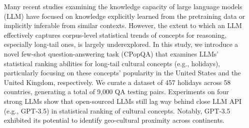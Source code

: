 Many recent studies examining the knowledge capacity of large language models (LLM) have focused on knowledge explicitly learned from the pretraining data or implicitly inferable from similar contexts. However, the extent to which an LLM effectively captures corpus-level statistical trends of concepts for reasoning, especially long-tail ones, is largely underexplored. In this study, we introduce a novel few-shot question-answering task (CPopQA) that examines LLMs' statistical ranking abilities for long-tail cultural concepts (e.g., holidays), particularly focusing on these concepts' popularity in the United States and the United Kingdom, respectively. We curate a dataset of 457 holidays across 58 countries, generating a total of 9,000 QA testing pairs. Experiments on four strong LLMs show that open-sourced LLMs still lag way behind close LLM API (e.g., GPT-3.5) in statistical ranking of cultural concepts. Notably,  GPT-3.5 exhibited its potential to identify geo-cultural proximity across continents.